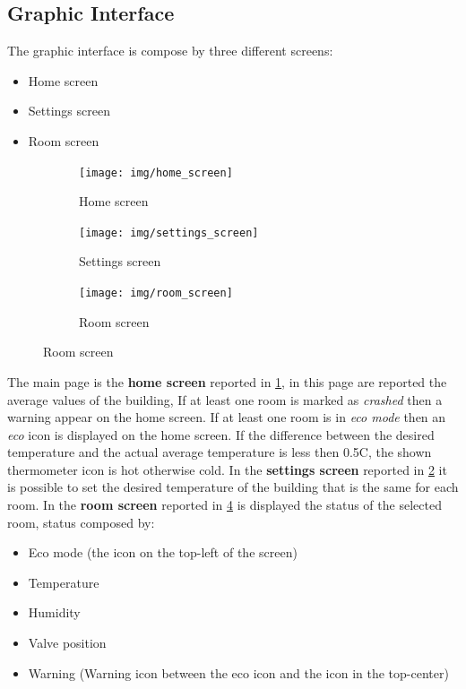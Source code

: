 \subsection{Graphic Interface}
The graphic interface is compose by three different screens:
\begin{itemize}
	\item Home screen
	\item Settings screen
	\item Room screen
\end{itemize}
\begin{figure}[H]
	\centering
	\begin{subfigure}{0.4\textwidth} %
		\texttt{[image: img/home\_screen]}
		\caption{Home screen}
		\label{fig:home_screen}
		\end{subfigure}
	\vspace{1em} %
	\begin{subfigure}{0.4\textwidth} %
		\texttt{[image: img/settings\_screen]}
		\caption{Settings screen}
		\label{fig:settings_screen}
	\end{subfigure}
	\begin{subfigure}{0.4\textwidth} %
		\texttt{[image: img/room\_screen]}
		\caption{Room screen}
		\label{fig:room_screen}
	\end{subfigure}
\end{figure}
The main page is the \textbf{home screen} reported in \ref{fig:home_screen}, in this page are reported the average values of the building,
If at least one room is marked as \textit{crashed} then a warning appear on the home screen.
If at least one room is in \textit{eco mode} then an \textit{eco} icon is displayed on the home screen.
If the difference between the desired temperature and the actual average temperature is less then 0.5C\degree, the shown thermometer icon is hot otherwise cold.
In the \textbf{settings screen} reported in \ref{fig:settings_screen} it is possible to set the desired temperature of the building that is the same for each room.
In the \textbf{room screen} reported in \ref{fig:room_screen} is displayed the status of the selected room, status composed by:
\begin{itemize}
	\item Eco mode (the icon on the top-left of the screen)
	\item Temperature
	\item Humidity
	\item Valve position
	\item Warning (Warning icon between the eco icon and the icon in the top-center)
\end{itemize}
